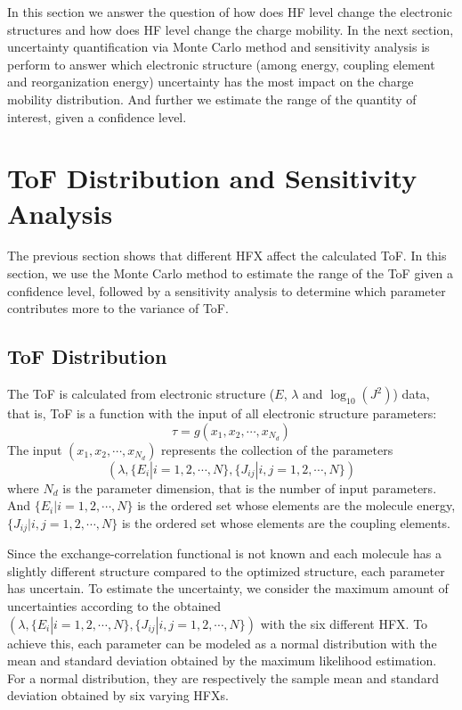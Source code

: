 \documentclass[letterpaper,12pt]{article}
\begin{document}
In this section we answer the question of how does HF level change the electronic structures and 
how does HF level change the charge mobility. 
In the next section, uncertainty quantification via Monte Carlo method and sensitivity analysis is perform to answer which electronic structure (among energy, coupling element and reorganization energy) uncertainty has the most impact on the charge mobility distribution. 
And further we estimate the range of the quantity of interest, given a confidence level.

\section{ToF Distribution and Sensitivity Analysis}
The previous section shows that different HFX affect the calculated ToF. In this section, we use the Monte Carlo method to estimate the range of the ToF given a confidence level, followed by a sensitivity analysis to determine which parameter contributes more to the variance of ToF. 

\subsection{ToF Distribution}
The ToF is calculated from electronic structure ($E$, $\lambda$ and $\log_{10}(J^2)$) data, that is, ToF is a function with the input of all electronic structure parameters:
\begin{equation}
    \tau = g(x_1, x_2, \cdots, x_{N_d})
    \label{eq:tau1}
\end{equation}
The input $(x_1, x_2, \cdots, x_{N_d})$ represents the collection of the parameters $$(\lambda, \{E_i|i=1,2,\cdots,N \}, \{J_{ij}|i,j=1,2,\cdots,N \})$$  where $N_d$ is the parameter dimension, that is the number of input parameters. 
And $\{E_i|i=1,2,\cdots,N \}$ is the ordered set whose elements are the molecule energy,
$\{J_{ij}|i,j=1,2,\cdots,N \}$ is the ordered set whose elements are the coupling elements. 

Since the exchange-correlation functional is not known and each molecule has a slightly different structure compared to the optimized structure, each parameter has uncertain. 
To estimate the uncertainty, we consider the maximum amount of uncertainties according to the obtained $(\lambda, \{E_i|i=1,2,\cdots,N \}, \{J_{ij}|i,j=1,2,\cdots,N \})$ with the six different HFX.
To achieve this, each parameter can be modeled as a normal distribution with the mean and standard deviation obtained by the maximum likelihood estimation. For a normal distribution, they are respectively the sample mean and standard deviation obtained by six varying HFXs.
\end{document}
